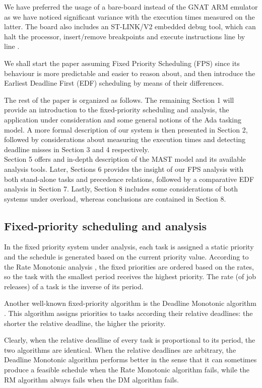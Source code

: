 \documentclass{article}
\begin{document}
We have preferred the usage of a bare-board instead of the GNAT ARM emulator as we have noticed significant variance with the execution times measured on the latter. The board also includes an ST-LINK/V2 embedded debug tool, which can halt the processor, insert/remove breakpoints and execute instructions line by line \cite{debug-trace}.

We shall start the paper assuming Fixed Priority Scheduling (FPS) since its behaviour is more predictable and easier to reason about, and then introduce the Earliest Deadline First (EDF) scheduling by means of their differences.

The rest of the paper is organized as follows. The remaining Section 1 will provide an introduction to the fixed-priority scheduling and analysis, the application under consideration and some general notions of the Ada tasking model. A more formal description of our system is then presented in Section 2, followed by considerations about measuring the execution times and detecting deadline misses in Section 3 and 4 respectively. \\
Section 5 offers and in-depth description of the MAST model and its available analysis tools. Later, Sections 6 provides the insight of our FPS analysis with both stand-alone tasks and precedence relations, followed by a comparative EDF analysis in Section 7. Lastly, Section 8 includes some considerations of both systems under overload, whereas conclusions are contained in Section 8.

\subsection{Fixed-priority scheduling and analysis}

In the fixed priority system under analysis, each task is assigned a static priority and the schedule is generated based on the current priority value. According to the Rate Monotonic analysis \cite{rm-dm}, the fixed priorities are ordered based on the rates, so the task with the smallest period receives the highest priority. The rate (of job releases) of a task is the inverse of its period.

Another well-known fixed-priority algorithm is the Deadline Monotonic algorithm \cite{rm-dm}. This algorithm assigns priorities to tasks according their relative deadlines: the shorter the relative deadline, the higher the priority.

Clearly, when the relative deadline of every task is proportional to its period, the two algorithms are identical. When the relative deadlines are arbitrary, the Deadline Monotonic algorithm performs better in the sense that it can sometimes produce a feasible schedule when the Rate Monotonic algorithm fails, while the RM algorithm always fails when the DM algorithm fails.
\end{document}
